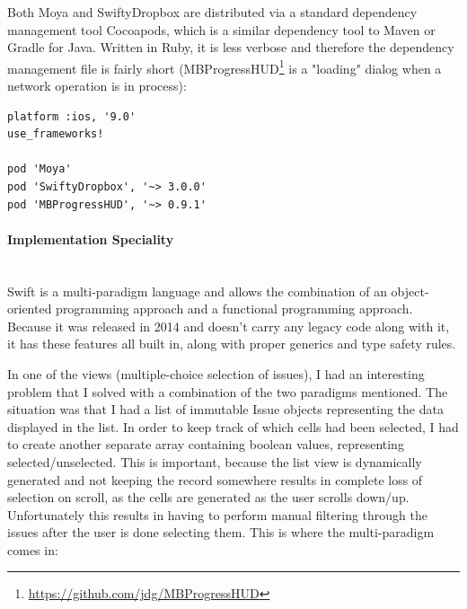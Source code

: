 \bigbreak

Both Moya and SwiftyDropbox are distributed via a standard dependency management tool Cocoapods, which is a similar dependency tool to Maven or Gradle for Java. Written in Ruby, it is less verbose and therefore the dependency management file is fairly short (MBProgressHUD\footnote{\url{https://github.com/jdg/MBProgressHUD}} is a "loading" dialog when a network operation is in process):

\bigbreak

\begin{lstlisting}
platform :ios, '9.0'
use_frameworks!

pod 'Moya'
pod 'SwiftyDropbox', '~> 3.0.0'
pod 'MBProgressHUD', '~> 0.9.1'
\end{lstlisting}

\newpage

\paragraph{Implementation Speciality}\mbox{}\\

Swift is a multi-paradigm language and allows the combination of an object-oriented programming approach and a functional programming approach. Because it was released in 2014 and doesn’t carry any legacy code along with it, it has these features all built in, along with proper generics and type safety rules. 

In one of the views (multiple-choice selection of issues), I had an interesting problem that I solved with a combination of the two paradigms mentioned. The situation was that I had a list of immutable Issue objects representing the data displayed in the list. In order to keep track of which cells had been selected, I had to create another separate array containing boolean values, representing selected/unselected. This is important, because the list view is dynamically generated and not keeping the record somewhere results in complete loss of selection on scroll, as the cells are generated as the user scrolls down/up. Unfortunately this results in having to perform manual filtering through the issues after the user is done selecting them. This is where the multi-paradigm comes in:

\bigbreak

